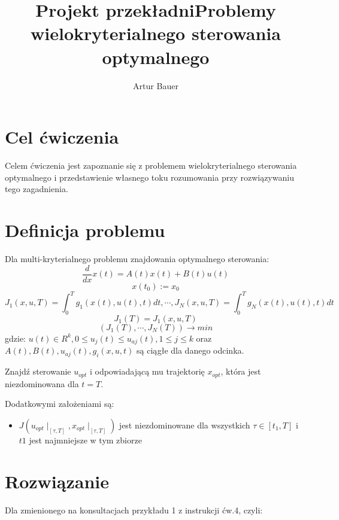 \documentclass[a4paper]{article}
\title{Projekt przekładni}
\author{Artur Bauer}
\title{Problemy wielokryterialnego sterowania optymalnego}
\begin{document}


\section{Cel ćwiczenia}


Celem ćwiczenia jest zapoznanie się z problemem wielokryterialnego sterowania optymalnego i przedstawienie własnego toku rozumowania przy rozwiązywaniu tego zagadnienia.  

\section{Definicja problemu}

Dla multi-kryterialnego problemu znajdowania optymalnego sterowania: 
$$ \frac{d}{dx} x(t) = A(t) x(t) + B(t) u(t)$$
$$ x(t_0) := x_0 $$
$$ J_1(x,u,T) = \int^T_0 g_1(x(t), u(t), t) dt, \cdots, J_N(x,u,T) = \int^T_0 g_N(x(t), u(t), t) dt$$
$$ J_1(T) = J_1(x,u,T) $$
$$ ( J_1(T), \cdots, J_N(T) ) \rightarrow min $$
gdzie: 
$ u(t)\in R^k, 0 \leq u_j(t) \leq u_{aj}(t), 1\leq j \leq k $
oraz 
$ A(t), B(t), u_{aj}(t), g_i(x,u,t)$
są ciągłe dla danego odcinka.

\noindent
Znajdź sterowanie $u_{opt}$  i odpowiadającą mu trajektorię $x_{opt}$, która jest niezdominowana dla $t=T$. 

\noindent
Dodatkowymi założeniami są:  
\begin{itemize}
    \item $J(u_{opt}\mid_{[\tau, T]}, x_{opt}\mid_{[\tau, T]})$  jest niezdominowane dla wszystkich $\tau \in [t_1, T]$ i $t1$ jest najmniejsze w tym zbiorze 
\end{itemize}

\section{Rozwiązanie}
Dla zmienionego na konsultacjach przykładu 1 z instrukcji ćw.4, czyli: 
\end{document}
